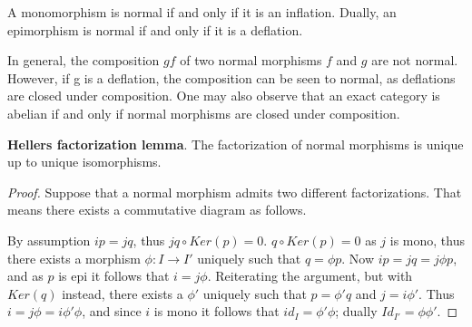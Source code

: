     \begin{remark}
        A monomorphism is normal if and only if it is an inflation. Dually, an epimorphism is normal if and only if it is a deflation.
    \end{remark}

    \begin{remark}
        In general, the composition $gf$ of two normal morphisms $f$ and $g$ are not normal. However, if g is a deflation, the composition can be seen to normal, as deflations are closed under composition. One may also observe that an exact category is abelian if and only if normal morphisms are closed under composition.
    \end{remark}

    \begin{lemma}
        \textbf{Hellers factorization lemma}. The factorization of normal morphisms is unique up to unique isomorphisms.
    \end{lemma}

    \begin{proof}
        Suppose that a normal morphism admits two different factorizations. That means there exists a commutative diagram as follows.
        \begin{center}
        \end{center}
        By assumption $ip=jq$, thus $jq\circ Ker(p)=0$. $q\circ Ker(p)=0$ as $j$ is mono, thus there exists a morphism $\phi:I\rightarrow I'$ uniquely such that $q=\phi p$. Now $ip=jq=j\phi p$, and as $p$ is epi it follows that $i=j\phi$. Reiterating the argument, but with $Ker(q)$ instead, there exists a $\phi '$ uniquely such that $p = \phi 'q$ and $j=i\phi '$. Thus $i=j\phi = i\phi '\phi$, and since $i$ is mono it follows that $id_I=\phi '\phi$; dually $Id_{I'}=\phi\phi '$.
    \end{proof}

